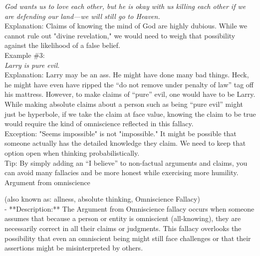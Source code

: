 \documentclass[a4paper,12pt,single,pdftex]{scrbook}
\begin{document}
    
      {\em God wants us to love each other, but he is okay with us killing each other if we are defending our land—we will still go to Heaven.}
    \\

    
      Explanation: Claims of knowing the mind of God are highly dubious. While we cannot rule out "divine revelation," we would need to weigh that possibility against the likelihood of a false belief.
    \\

    
      Example \#3: 
    \\

    
      {\em Larry is pure evil.}
    \\

    
      Explanation: Larry may be an ass. He might have done many bad things. Heck, he might have even have ripped the “do not remove under penalty of law” tag off his mattress. However, to make claims of “pure” evil, one would have to be Larry. While making absolute claims about a person such as being “pure evil” might just be hyperbole, if we take the claim at face value, knowing the claim to be true would require the kind of omniscience reflected in this fallacy.
    \\

    
      Exception: "Seems impossible" is not "impossible." It might be possible that someone actually has the detailed knowledge they claim. We need to keep that option open when thinking probabilistically.
    \\

    
      Tip: By simply adding an “I believe” to non-factual arguments and claims, you can avoid many fallacies and be more honest while exercising more humility.
    \\

  

Argument from omniscience
    
      (also known as: allness, absolute thinking, Omniscience Fallacy)
    \\

  
    
      - **Description:** The Argument from Omniscience fallacy occurs when someone assumes that because a person or entity is omniscient (all-knowing), they are necessarily correct in all their claims or judgments. This fallacy overlooks the possibility that even an omniscient being might still face challenges or that their assertions might be misinterpreted by others.
    \\
\end{document}
